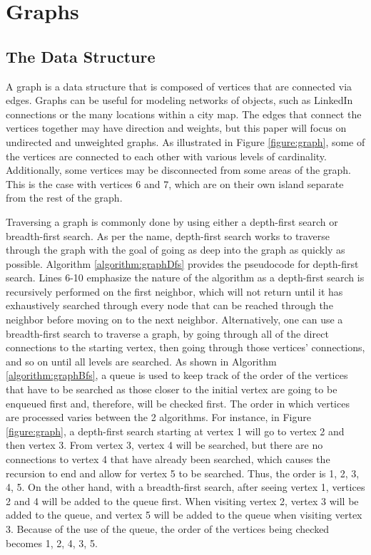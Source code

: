 \documentclass[letterpaper, 10pt,DIV=13]{scrartcl}
\numberwithin{equation}{section} %
\numberwithin{figure}{section} %
\numberwithin{table}{section} %
\begin{document}
\section{Graphs}
\subsection{The Data Structure}\label{graph}
A graph is a data structure that is composed of vertices that are connected via edges. Graphs can be useful for modeling networks of objects, such as LinkedIn connections or the many locations within a city map. The edges that connect the vertices together may have direction and weights, but this paper will focus on undirected and unweighted graphs. As illustrated in Figure \ref{figure:graph}, some of the vertices are connected to each other with various levels of cardinality. Additionally, some vertices may be disconnected from some areas of the graph. This is the case with vertices 6 and 7, which are on their own island separate from the rest of the graph.

Traversing a graph is commonly done by using either a depth-first search or breadth-first search. As per the name, depth-first search works to traverse through the graph with the goal of going as deep into the graph as quickly as possible. Algorithm \ref{algorithm:graphDfs} provides the pseudocode for depth-first search. Lines 6-10 emphasize the nature of the algorithm as a depth-first search is recursively performed on the first neighbor, which will not return until it has exhaustively searched through every node that can be reached through the neighbor before moving on to the next neighbor. Alternatively, one can use a breadth-first search to traverse a graph, by going through all of the direct connections to the starting vertex, then going through those vertices' connections, and so on until all levels are searched. As shown in Algorithm \ref{algorithm:graphBfs}, a queue is used to keep track of the order of the vertices that have to be searched as those closer to the initial vertex are going to be enqueued first and, therefore, will be checked first. The order in which vertices are processed varies between the 2 algorithms. For instance, in Figure \ref{figure:graph}, a depth-first search starting at vertex 1 will go to vertex 2 and then vertex 3. From vertex 3, vertex 4 will be searched, but there are no connections to vertex 4 that have already been searched, which causes the recursion to end and allow for vertex 5 to be searched. Thus, the order is 1, 2, 3, 4, 5. On the other hand, with a breadth-first search, after seeing vertex 1, vertices 2 and 4 will be added to the queue first. When visiting vertex 2, vertex 3 will be added to the queue, and vertex 5 will be added to the queue when visiting vertex 3. Because of the use of the queue, the order of the vertices being checked becomes 1, 2, 4, 3, 5.
\end{document}
